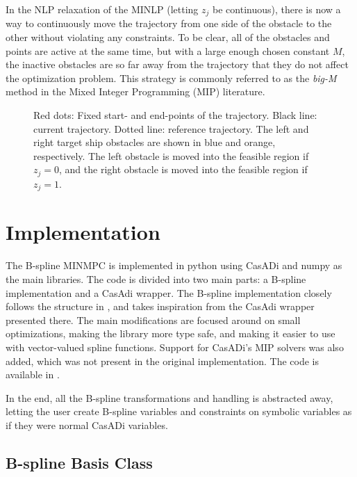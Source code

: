 In the NLP relaxation of the MINLP (letting $z_j$ be continuous), there is now a way to continuously move the trajectory from one side of the obstacle to the other without violating any constraints. To be clear, all of the obstacles and points are active at the same time, but with a large enough chosen constant $M$, the inactive obstacles are so far away from the trajectory that they do not affect the optimization problem. This strategy is commonly referred to as the \emph{big-M} method in the Mixed Integer Programming (MIP) literature.

\begin{figure}
    \centering
    
    \caption{Red dots: Fixed start- and end-points of the trajectory. Black line: current trajectory. Dotted line: reference trajectory. The left and right target ship obstacles are shown in blue and orange, respectively. The left obstacle is moved into the feasible region if $z_j = 0$, and the right obstacle is moved into the feasible region if $z_j = 1$.}
    \label{fig:non-convex-obstacle-mi}
\end{figure}

\section{Implementation}

The B-spline MINMPC is implemented in python using CasADi \citep{casadi} and numpy \citep{numpy} as the main libraries. The code is divided into two main parts: a B-spline implementation and a CasAdi wrapper. 
The B-spline implementation closely follows the structure in \citet{mercy2016spline}, and takes inspiration from the CasAdi wrapper presented there. The main modifications are focused around on small optimizations, making the library more type safe, and making it easier to use with vector-valued spline functions. Support for CasADi's MIP solvers was also added, which was not present in the original implementation. 
The code is available in .

In the end, all the B-spline transformations and handling is abstracted away, letting the user create B-spline variables and constraints on symbolic variables as if they were normal CasADi variables. 


\subsection{B-spline Basis Class}

